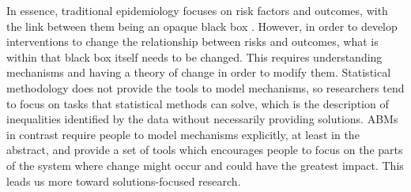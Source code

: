 \documentclass[review]{elsarticle}
\begin{document}
In essence, traditional epidemiology focuses on risk factors and outcomes, with the link between them being an opaque black box \citep{susser1996}. However, in order to develop interventions to change the relationship between risks and outcomes, what is within that black box itself needs to be changed. This requires understanding mechanisms and having a theory of change in order to modify them. Statistical methodology does not provide the tools to model mechanisms, so researchers tend to focus on tasks that statistical methods can solve, which is the description of inequalities identified by the data without necessarily providing solutions. ABMs in contrast require people to model mechanisms explicitly, at least in the abstract, and provide a set of tools which encourages people to focus on the parts of the system where change might occur and could have the greatest impact. This leads us more toward solutions-focused research.
% 
% 
\end{document}
